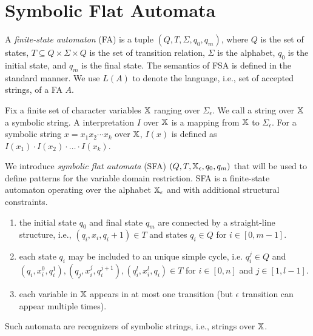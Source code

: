 \documentclass{llncs}
\begin{document}
\section{Symbolic Flat Automata} \label{section:sfa}
A \emph{finite-state automaton} (FA) is a tuple $(Q,T,\Sigma,q_0,q_m)$, where $Q$ is the set of states, $T\subseteq Q\times \Sigma\times Q $ is the set of transition relation, $\Sigma$ is the alphabet, $q_0$ is the initial state, and $q_m$ is the final state. The semantics of FSA is defined in the standard manner. We use $L(A)$ to denote the language, i.e., set of accepted strings, of a FA $A$.

Fix a finite set of character variables $\mbox{$\mathbb{X}$}$ ranging over $\Sigma_\epsilon$.
We call a string over $\mbox{$\mathbb{X}$}$ a symbolic string.
A interpretation $I$ over $\mbox{$\mathbb{X}$}$ is a mapping from $\mbox{$\mathbb{X}$}$ to $\Sigma_\epsilon$.
For a symbolic string $x= x_1x_2\cdots x_k$ over $\mbox{$\mathbb{X}$}$, $I(x)$ is defined as $I(x_1)\cdot I(x_2)\cdot \ldots \cdot I(x_k)$.

We introduce \emph{symbolic flat automata} (SFA) $(Q,T,\mbox{$\mathbb{X}$}_\epsilon,q_0,q_m)$ that will be used to define patterns for the variable domain restriction. SFA is a finite-state automaton operating over the alphabet $\mbox{$\mathbb{X}$}_\epsilon$ and with additional structural constraints.
\begin{enumerate}
	\item the initial state $q_0$ and final state $q_m$ are connected by a straight-line structure, i.e., $(q_i,x_i,q_i+1) \in T$ and states $q_i \in Q$  for $i\in[0,m-1]$.
	\item  each state $q_i$ may be included to an unique simple cycle, i.e. $q_i^j \in Q$ and $(q_i, x_i^0, q_i^1), (q_j, x_i^j, q_i^{j+1}), (q_i^l, x_i^l, q_i) \in T$ for $i\in [0,n]$ and $j\in [1,l-1]$. 
	\item each variable in $\mbox{$\mathbb{X}$}$ appears in at most one transition (but $\epsilon$ transition can appear multiple times). 
\end{enumerate} 
Such automata are recognizers of symbolic strings, i.e., strings over $\mbox{$\mathbb{X}$}$.
\end{document}
